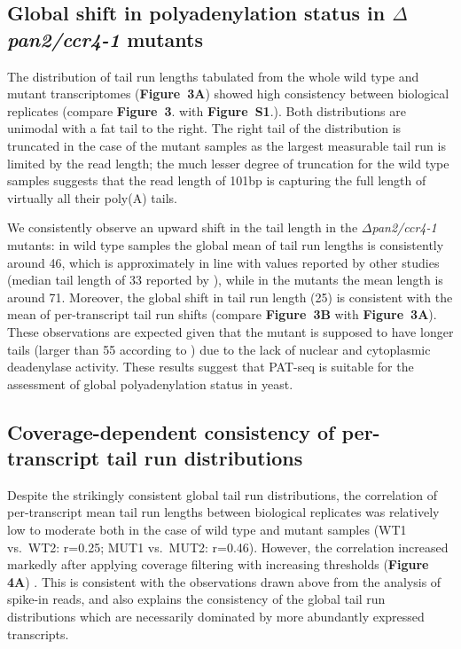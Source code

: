 \documentclass[10pt]{article}
\begin{document}
\subsection*{Global shift in polyadenylation status in \textit{$\Delta$pan2/ccr4-1} mutants}

The distribution of tail run lengths tabulated from the whole wild type and mutant transcriptomes (\textbf{Figure~3A}) showed high consistency between biological replicates (compare \textbf{Figure~3}. with \textbf{Figure~S1}.). Both distributions are unimodal with a fat tail to the right. The right tail of the distribution is truncated in the case of the mutant samples as the largest measurable tail run is limited by the read length; the much lesser degree of truncation for the wild type samples suggests that the read length of 101bp is capturing the full length of virtually all their poly(A) tails.

We consistently observe an upward shift in the tail length in the \textit{$\Delta$pan2/ccr4-1} mutants: in wild type samples the global mean of tail run lengths is consistently around 46, which is approximately in line with values reported by other studies (median tail length of 33 reported by \cite{subtelny14}), while in the mutants the mean length is around 71. Moreover, the global shift in tail run length (25) is consistent with the mean of per-transcript tail run shifts (compare \textbf{Figure~3B} with \textbf{Figure~3A}). These observations are expected given that the mutant is supposed to have longer tails (larger than 55 according to \cite{beilharz07}) due to the lack of nuclear and cytoplasmic deadenylase activity. These results suggest that PAT-seq is suitable for the assessment of global polyadenylation status in yeast.

\subsection*{Coverage-dependent consistency of per-transcript tail run distributions}

Despite the strikingly consistent global tail run distributions, the correlation of per-transcript mean tail run lengths between biological replicates was relatively low to moderate both in the case of wild type and mutant samples (WT1 vs.\ WT2: r=0.25; MUT1 vs.\ MUT2: r=0.46). However, the correlation increased markedly after applying coverage filtering with increasing thresholds (\textbf{Figure 4A}) . This is consistent with the observations drawn above from the analysis of spike-in reads, and also explains the consistency of the global tail run distributions which are necessarily dominated by more abundantly expressed transcripts. 
\end{document}
